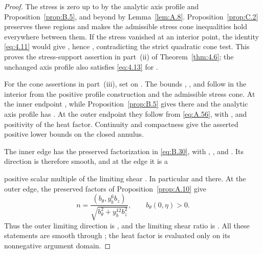 \begin{proof}
The stress is zero up to  by the analytic axis profile
and Proposition~\ref{prop:B.5}, and beyond  by
Lemma~\ref{lem:A.8}. Proposition~\ref{prop:C.2} preserves these regions and makes
the admissible stress cone inequalities hold everywhere between them. If the
stress vanished at an interior point, the identity \eqref{eq:4.11} would give
, hence
, contradicting the strict quadratic cone test. This
proves the stress-support assertion in part~\textup{(ii)} of
Theorem~\ref{thm:4.6}; the unchanged axis profile also satisfies \eqref{eq:4.13}
for .

For the cone assertions in part~\textup{(iii)}, set
 on
. The bounds
, , and
 follow in the interior from the positive profile
construction and the admissible stress cone. At the inner endpoint
, while Proposition~\ref{prop:B.5} gives
 there and the analytic axis profile has
. At the outer endpoint they follow from
\eqref{eq:A.56}, with , and positivity of the heat
factor. Continuity and compactness give the asserted positive lower bounds on the
closed annulus.

The inner edge has the preserved factorization
 in \eqref{eq:B.30}, with
,
, and
. Its direction is therefore
smooth, and at the edge it is a

%
positive scalar multiple of the limiting shear
. In particular
 and
 there. At the outer edge, the preserved
factors of Proposition~\ref{prop:A.10} give
\[
  n=\frac{(b_\theta,y_b^6b_z)}
          {\sqrt{b_\theta^2+y_b^{12}b_z^2}},
  \qquad b_\theta(0,\eta)>0.
\]
Thus the outer limiting direction is , and the
limiting shear ratio is . All these statements are
smooth through ; the heat factor is evaluated only
on its nonnegative argument domain.


\end{proof}
